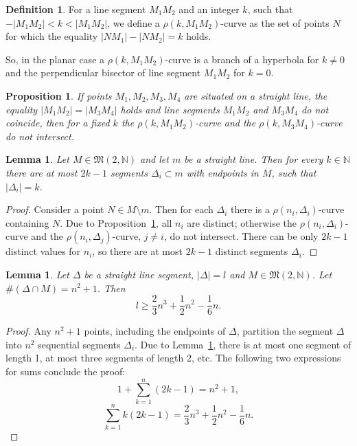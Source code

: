 \documentclass[a4paper,14pt]{article} %
\theoremstyle{plain}
\newtheorem{lemma}[theorem]{Lemma}
\newtheorem{proposition}[theorem]{Proposition}
\theoremstyle{definition}
\newtheorem{definition}[theorem]{Definition}
\begin{document}
\begin{definition}
	For a line segment $M_1 M_2$ and an integer $k$, such that $-|M_1 M_2| < k < |M_1 M_2|$,
	we define a $\rho(k,M_1 M_2)$-curve as the set of points $N$
	for which the equality $|N M_1| - |N M_2| = k$ holds.
\end{definition}
So, in the planar case a $\rho(k,M_1 M_2)$-curve
is a branch of a hyperbola for $k\neq 0$ and the perpendicular bisector of line segment $M_1 M_2$ for $k=0$.

\begin{proposition}
	\label{obs:rho_curves}
	If points $M_1,M_2,M_3,M_4$ are situated on a straight line,
	the equality $|M_1 M_2| = |M_3 M_4|$ holds and line segments $M_1 M_2$ and $M_3 M_4$ do not coincide,
	then for a fixed $k$ the $\rho(k,M_1 M_2)$-curve and the $\rho(k,M_3 M_4)$-curve
	do not intersect.
\end{proposition}

\begin{lemma}
	\label{lem:2k-1_segments}
	Let $M \in \mathfrak{M}(2,\mathbb{N})$ and let $m$ be a straight line.
	Then for every $k\in\mathbb{N}$ there are at most $2k-1$ segments $\Delta_i \subset m$ with endpoints in $M$,
	such that $|\Delta_i| = k$.
\end{lemma}
\begin{proof}
	Consider a point $N\in M \setminus m$.
	Then for each $\Delta_i$ there is a $\rho(n_i,\Delta_i)$-curve containing $N$.
	Due to Proposition~\ref{obs:rho_curves}, all $n_i$ are distinct;
	otherwise the $\rho(n_i,\Delta_i)$-curve and the $\rho(n_i,\Delta_j)$-curve, $j\neq i$, do not intersect.
	There can be only $2k-1$ distinct values for $n_i$,
	so there are at most $2k-1$ distinct segments $\Delta_i$.
\end{proof}

\begin{lemma}
	\label{lem:line_segment_with n_squared_plus_one_points}
	Let $\Delta$ be a straight line segment, $|\Delta|=l$ and $M \in \mathfrak{M}(2,\mathbb{N})$.
	Let $\#(\Delta \cap M) = n^2 + 1$.
	Then
	\begin{equation}
		l \geq \frac{2}{3}n^3+\frac{1}{2}n^2-\frac{1}{6}n
		.
	\end{equation}
\end{lemma}

\begin{proof}
	Any $n^2+1$ points, including the endpoints of $\Delta$, partition the segment $\Delta$ into $n^2$
	sequential segments $\Delta_i$.
	Due to Lemma~\ref{lem:2k-1_segments}, there is at most one segment of length 1,
	at most three segments of length 2, etc.
	The following two expressions for sums conclude the proof:
	\begin{equation}
		1 + \sum_{k=1}^n (2k-1) = n^2 + 1
		,
	\end{equation}
	\begin{equation}
		\sum_{k=1}^n k(2k-1) = \frac{2}{3}n^3+\frac{1}{2}n^2-\frac{1}{6}n
		.
	\end{equation}
\end{proof}
\end{document}
